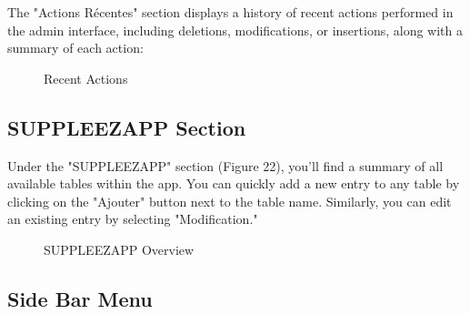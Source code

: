 \documentclass[12pt]{article}
\begin{document}
The "Actions Récentes" section displays a history of recent actions performed in the admin interface, including deletions, modifications, or insertions, along with a summary of each action:

\begin{figure}[H]
    \centering
    \caption{Recent Actions}
\end{figure}

\subsection{SUPPLEEZAPP Section}

Under the "SUPPLEEZAPP" section (Figure 22), you'll find a summary of all available tables within the app. You can quickly add a new entry to any table by clicking on the "Ajouter" button next to the table name. Similarly, you can edit an existing entry by selecting "Modification."

\begin{figure}[H]
    \centering
    \caption{SUPPLEEZAPP Overview}
\end{figure}

\subsection{Side Bar Menu}
\end{document}
